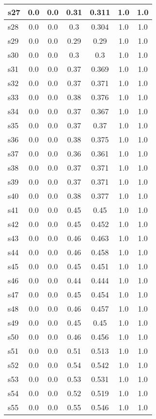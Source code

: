\documentclass{article}
\begin{document}
\begin{tabular}{|l|c|c|c|c|c|c|}
s27 &0.0 & 0.0 & 0.31 & 0.311 & 1.0 & 1.0\\
\hline
s28 &0.0 & 0.0 & 0.3 & 0.304 & 1.0 & 1.0\\
\hline
s29 &0.0 & 0.0 & 0.29 & 0.29 & 1.0 & 1.0\\
\hline
s30 &0.0 & 0.0 & 0.3 & 0.3 & 1.0 & 1.0\\
\hline
s31 &0.0 & 0.0 & 0.37 & 0.369 & 1.0 & 1.0\\
\hline
s32 &0.0 & 0.0 & 0.37 & 0.371 & 1.0 & 1.0\\
\hline
s33 &0.0 & 0.0 & 0.38 & 0.376 & 1.0 & 1.0\\
\hline
s34 &0.0 & 0.0 & 0.37 & 0.367 & 1.0 & 1.0\\
\hline
s35 &0.0 & 0.0 & 0.37 & 0.37 & 1.0 & 1.0\\
\hline
s36 &0.0 & 0.0 & 0.38 & 0.375 & 1.0 & 1.0\\
\hline
s37 &0.0 & 0.0 & 0.36 & 0.361 & 1.0 & 1.0\\
\hline
s38 &0.0 & 0.0 & 0.37 & 0.371 & 1.0 & 1.0\\
\hline
s39 &0.0 & 0.0 & 0.37 & 0.371 & 1.0 & 1.0\\
\hline
s40 &0.0 & 0.0 & 0.38 & 0.377 & 1.0 & 1.0\\
\hline
s41 &0.0 & 0.0 & 0.45 & 0.45 & 1.0 & 1.0\\
\hline
s42 &0.0 & 0.0 & 0.45 & 0.452 & 1.0 & 1.0\\
\hline
s43 &0.0 & 0.0 & 0.46 & 0.463 & 1.0 & 1.0\\
\hline
s44 &0.0 & 0.0 & 0.46 & 0.458 & 1.0 & 1.0\\
\hline
s45 &0.0 & 0.0 & 0.45 & 0.451 & 1.0 & 1.0\\
\hline
s46 &0.0 & 0.0 & 0.44 & 0.444 & 1.0 & 1.0\\
\hline
s47 &0.0 & 0.0 & 0.45 & 0.454 & 1.0 & 1.0\\
\hline
s48 &0.0 & 0.0 & 0.46 & 0.457 & 1.0 & 1.0\\
\hline
s49 &0.0 & 0.0 & 0.45 & 0.45 & 1.0 & 1.0\\
\hline
s50 &0.0 & 0.0 & 0.46 & 0.456 & 1.0 & 1.0\\
\hline
s51 &0.0 & 0.0 & 0.51 & 0.513 & 1.0 & 1.0\\
\hline
s52 &0.0 & 0.0 & 0.54 & 0.542 & 1.0 & 1.0\\
\hline
s53 &0.0 & 0.0 & 0.53 & 0.531 & 1.0 & 1.0\\
\hline
s54 &0.0 & 0.0 & 0.52 & 0.519 & 1.0 & 1.0\\
\hline
s55 &0.0 & 0.0 & 0.55 & 0.546 & 1.0 & 1.0\\

\end{tabular}
\end{document}
